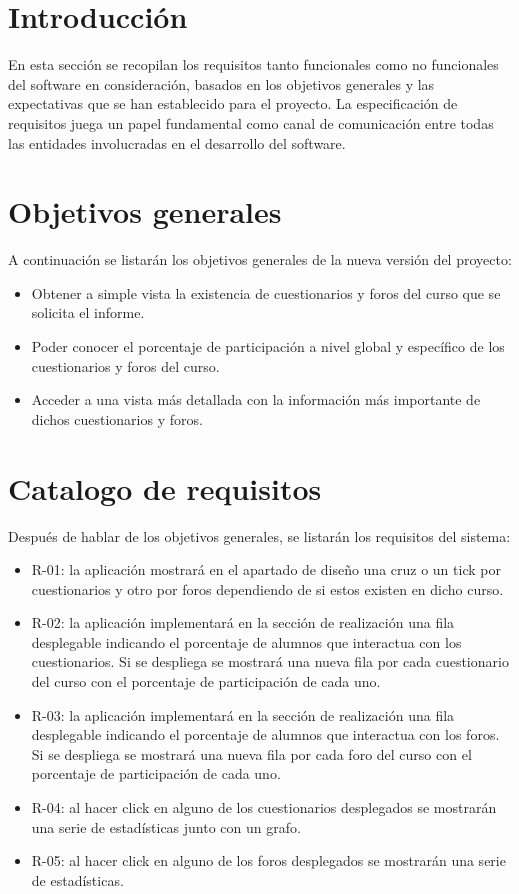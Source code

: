 \label{apendice:B}
\section{Introducción}
En esta sección se recopilan los requisitos tanto funcionales como no funcionales del software en consideración, basados en los objetivos generales y las expectativas que se han establecido para el proyecto. La especificación de requisitos juega un papel fundamental como canal de comunicación entre todas las entidades involucradas en el desarrollo del software.
\section{Objetivos generales}
A continuación se listarán los objetivos generales de la nueva versión del proyecto:
\begin{itemize}
	\item
	Obtener a simple vista la existencia de cuestionarios y foros del curso que se solicita el informe.
	\item
	Poder conocer el porcentaje de participación a nivel global y específico de los cuestionarios y foros del curso.
	\item
	Acceder a una vista más detallada con la información más importante de dichos cuestionarios y foros.
\end{itemize}

\section{Catalogo de requisitos}
Después de hablar de los objetivos generales, se listarán los requisitos del sistema:
\begin{itemize}
	\item R-01: la aplicación mostrará en el apartado de diseño una cruz o un tick por cuestionarios y otro por foros dependiendo de si estos existen en dicho curso.
	\item R-02: la aplicación implementará en la sección de realización una fila desplegable indicando el porcentaje de alumnos que interactua con los cuestionarios. Si se despliega se mostrará una nueva fila por cada cuestionario del curso con el porcentaje de participación de cada uno.
	\item R-03: la aplicación implementará en la sección de realización una fila desplegable indicando el porcentaje de alumnos que interactua con los foros. Si se despliega se mostrará una nueva fila por cada foro del curso con el porcentaje de participación de cada uno.
	\item R-04: al hacer click en alguno de los cuestionarios desplegados se mostrarán una serie de estadísticas junto con un grafo.
	\item R-05: al hacer click en alguno de los foros desplegados se mostrarán una serie de estadísticas.
\end{itemize}

